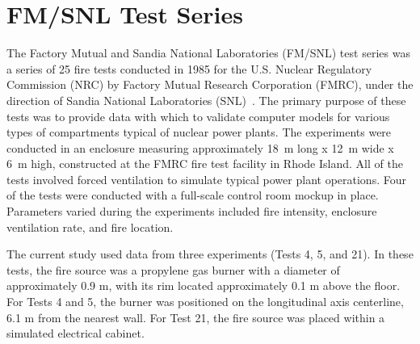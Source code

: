 \section{FM/SNL Test Series}

The Factory Mutual and Sandia National Laboratories (FM/SNL) test series was a series of 25 fire
tests conducted in 1985 for the U.S. Nuclear Regulatory Commission (NRC) by Factory Mutual Research Corporation (FMRC), under
the direction of Sandia National Laboratories (SNL)~\cite{Nowlen:NUREG4681,Nowlen:NUREG4527}. The primary purpose of these tests was to
provide data with which to validate computer models for various types of compartments typical of nuclear power plants. The
experiments were conducted in an enclosure measuring approximately 18~m long x 12~m wide x 6~m high, constructed at the FMRC fire test facility in Rhode Island.
All of the tests involved forced ventilation to simulate typical power plant operations. Four of
the tests were conducted with a full-scale control room mockup in place. Parameters varied
during the experiments included fire intensity, enclosure ventilation rate, and fire location.

The current study used data from three experiments (Tests 4, 5, and 21). In these tests, the fire
source was a propylene gas burner with a diameter of approximately 0.9 m, with its rim
located approximately 0.1 m above the floor. For Tests 4 and 5, the burner was positioned on the longitudinal axis centerline, 6.1 m from
the nearest wall. For Test 21, the fire source was placed within a simulated electrical
cabinet.

